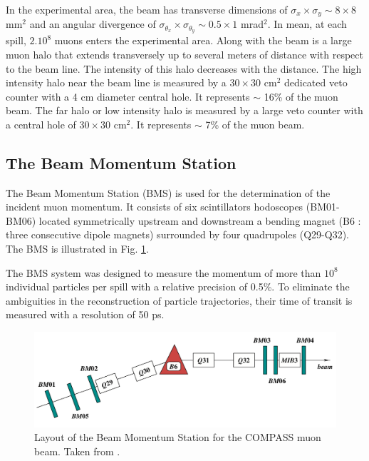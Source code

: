 In the experimental area, the beam has transverse dimensions of $\sigma_x \times \sigma_y \sim 8 \times 8 $ mm$^2$ and an angular divergence of $\sigma_{\theta_x} \times \sigma_{\theta_y} \sim 0.5 \times 1 $ mrad$^2$. In mean, at each spill, $2.10^8$ muons enters the experimental area. Along with the beam is a large muon halo that extends transversely up to several meters of distance with respect to the beam line. The intensity of this halo decreases with the distance. The high intensity halo near the beam line is measured by a $30 \times 30$ cm$^2$ dedicated veto counter with a 4 cm diameter central hole. It represents $\sim$ 16\% of the muon beam. The far halo or low intensity halo is measured by a large veto counter with a central hole of $30 \times 30$ cm$^2$. It represents $\sim$ 7\% of the muon beam.

\subsection{The Beam Momentum Station}

The Beam Momentum Station (BMS) is used for the determination of the incident muon momentum. It consists of six scintillators hodoscopes (BM01-BM06) located symmetrically upstream and downstream a bending magnet (B6 : three consecutive dipole magnets) surrounded by four quadrupoles (Q29-Q32). The BMS is illustrated in Fig. \ref{pic:BMS}.

The BMS system was designed to measure the momentum of more than $10^8$ individual particles per spill with a relative precision of 0.5\%. To eliminate the ambiguities in the reconstruction of particle trajectories, their time of transit is measured with a resolution of 50 ps.

\begin{figure}[!h]
  \centering
	\includegraphics[scale=0.5]{./gfx/BMS.png}
	\caption{Layout of the Beam Momentum Station for the COMPASS muon beam. Taken from \cite{NIM}.}
	\label{pic:BMS}
\end{figure}


